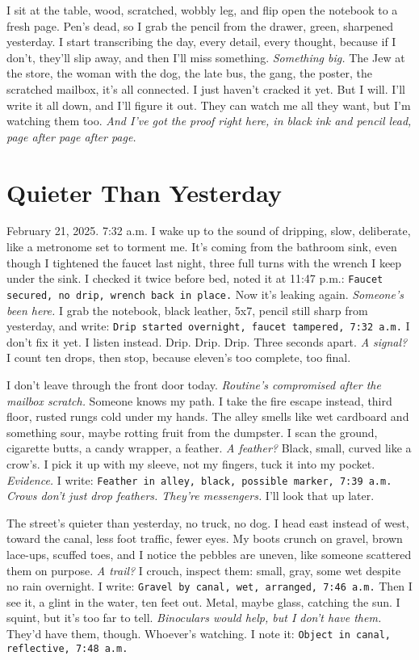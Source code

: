 \documentclass[12pt,oneside]{book}
\newcommand{\note}[1]{\texttt{#1}}
\begin{document}
I sit at the table, wood, scratched, wobbly leg, and flip open the notebook to a fresh page. Pen’s dead, so I grab the pencil from the drawer, green, sharpened yesterday. I start transcribing the day, every detail, every thought, because if I don’t, they’ll slip away, and then I’ll miss something. \textit{Something big.} The Jew at the store, the woman with the dog, the late bus, the gang, the poster, the scratched mailbox, it’s all connected. I just haven’t cracked it yet. But I will. I’ll write it all down, and I’ll figure it out. They can watch me all they want, but I’m watching them too. \textit{And I’ve got the proof right here, in black ink and pencil lead, page after page after page.}

\chapter{Quieter Than Yesterday}

February 21, 2025. 7:32 a.m. I wake up to the sound of dripping, slow, deliberate, like a metronome set to torment me. It’s coming from the bathroom sink, even though I tightened the faucet last night, three full turns with the wrench I keep under the sink. I checked it twice before bed, noted it at 11:47 p.m.: \note{Faucet secured, no drip, wrench back in place.} Now it’s leaking again. \textit{Someone’s been here.} I grab the notebook, black leather, 5x7, pencil still sharp from yesterday, and write: \note{Drip started overnight, faucet tampered, 7:32 a.m.} I don’t fix it yet. I listen instead. Drip. Drip. Drip. Three seconds apart. \textit{A signal?} I count ten drops, then stop, because eleven’s too complete, too final.

I don’t leave through the front door today. \textit{Routine’s compromised after the mailbox scratch.} Someone knows my path. I take the fire escape instead, third floor, rusted rungs cold under my hands. The alley smells like wet cardboard and something sour, maybe rotting fruit from the dumpster. I scan the ground, cigarette butts, a candy wrapper, a feather. \textit{A feather?} Black, small, curved like a crow’s. I pick it up with my sleeve, not my fingers, tuck it into my pocket. \textit{Evidence.} I write: \note{Feather in alley, black, possible marker, 7:39 a.m.} \textit{Crows don’t just drop feathers. They’re messengers.} I’ll look that up later.

The street’s quieter than yesterday, no truck, no dog. I head east instead of west, toward the canal, less foot traffic, fewer eyes. My boots crunch on gravel, brown lace-ups, scuffed toes, and I notice the pebbles are uneven, like someone scattered them on purpose. \textit{A trail?} I crouch, inspect them: small, gray, some wet despite no rain overnight. I write: \note{Gravel by canal, wet, arranged, 7:46 a.m.} Then I see it, a glint in the water, ten feet out. Metal, maybe glass, catching the sun. I squint, but it’s too far to tell. \textit{Binoculars would help, but I don’t have them.} They’d have them, though. Whoever’s watching. I note it: \note{Object in canal, reflective, 7:48 a.m.}
\end{document}
